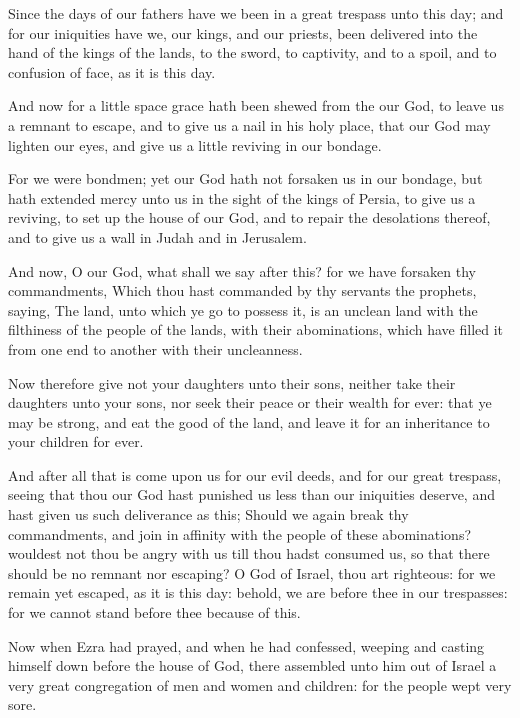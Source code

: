 \Verse Since the days of our fathers have we been in a great trespass unto this day; and for our iniquities have we, our kings, and our priests, been delivered into the hand of the kings of the lands, to the sword, to captivity, and to a spoil, and to confusion of face, as it is this day.

\Verse And now for a little space grace hath been shewed from the \LORD our God, to leave us a remnant to escape, and to give us a nail in his holy place, that our God may lighten our eyes, and give us a little reviving in our bondage.

\Verse For we were bondmen; yet our God hath not forsaken us in our bondage, but hath extended mercy unto us in the sight of the kings of Persia, to give us a reviving, to set up the house of our God, and to repair the desolations thereof, and to give us a wall in Judah and in Jerusalem.

\Verse And now, O our God, what shall we say after this? for we have forsaken thy commandments, \Verse Which thou hast commanded by thy servants the prophets, saying, The land, unto which ye go to possess it, is an unclean land with the filthiness of the people of the lands, with their abominations, which have filled it from one end to another with their uncleanness.

\Verse Now therefore give not your daughters unto their sons, neither take their daughters unto your sons, nor seek their peace or their wealth for ever: that ye may be strong, and eat the good of the land, and leave it for an inheritance to your children for ever.

\Verse And after all that is come upon us for our evil deeds, and for our great trespass, seeing that thou our God hast punished us less than our iniquities deserve, and hast given us such deliverance as this; \Verse Should we again break thy commandments, and join in affinity with the people of these abominations? wouldest not thou be angry with us till thou hadst consumed us, so that there should be no remnant nor escaping?  \Verse O \LORD God of Israel, thou art righteous: for we remain yet escaped, as it is this day: behold, we are before thee in our trespasses: for we cannot stand before thee because of this.


\Chapter
\Verse Now when Ezra had prayed, and when he had confessed, weeping and casting himself down before the house of God, there assembled unto him out of Israel a very great congregation of men and women and children: for the people wept very sore.

